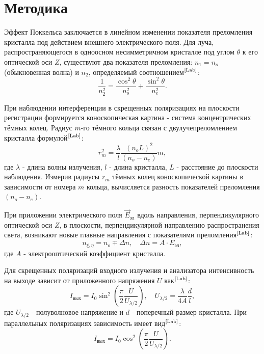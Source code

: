 \chapter{Методика} \vspace{-20pt}
\label{ch:methods}

Эффект Поккельса заключается в линейном изменении показателя преломления кристалла под действием внешнего электрического поля. 
Для луча, распространяющегося в одноосном несимметричном кристалле под углом $\theta$ к его оптической оси $Z$, существуют два показателя преломления: $n_1 = n_o$ (обыкновенная волна) и $n_2$, определяемый соотношением$^\text{\cite{Lab}}$:
\begin{equation} \label{eq:n2}
    \frac{1}{n_2^2} = \frac{\cos^2\theta}{n_o^2} + \frac{\sin^2\theta}{n_e^2}.
\end{equation}

При наблюдении интерференции в скрещенных поляризациях на плоскости регистрации формируется коноскопическая картина - система концентрических тёмных колец. Радиус $m$-го тёмного кольца связан с двулучепреломлением кристалла формулой$^\text{\cite{Lab}}$:
\begin{equation} \label{eq:ring_radius}
    r_m^2 = \frac{\lambda}{l} \frac{(n_o L)^2}{(n_o - n_e)} m,
\end{equation}
где $\lambda$ - длина волны излучения, $l$ - длина кристалла, $L$ - расстояние до плоскости наблюдения. Измерив радиусы $r_m$ тёмных колец коноскопической картины в зависимости от номера $m$ кольца, вычисляется разность показателей преломления $(n_o - n_e)$.

При приложении электрического поля $\vec{E}_{\text{эл}}$ вдоль направления, перпендикулярного оптической оси $Z$, в плоскости, перпендикулярной направлению распространения света, возникают новые главные направления с показателями преломления$^\text{\cite{Lab}}$:
\begin{equation} \label{eq:delta_n}
    n_{\xi,\eta} = n_o \mp \Delta n, \quad \Delta n = A \cdot E_{\text{эл}},
\end{equation}
где $A$ - электрооптический коэффициент кристалла.

Для скрещенных поляризаций входного излучения и анализатора интенсивность на выходе зависит от приложенного напряжения $U$ как$^\text{\cite{Lab}}$:
\begin{equation} \label{eq:intensity_crossed}
    I_{\text{вых}} = I_0 \sin^2\left(\frac{\pi}{2} \frac{U}{U_{\lambda/2}}\right),
        \quad U_{\lambda/2} = \frac{\lambda}{4A} \frac{d}{l},
\end{equation}
где $U_{\lambda/2}$ - полуволновое напряжение и $d$ - поперечный размер кристалла. При параллельных поляризациях зависимость имеет вид$^\text{\cite{Lab}}$:
\begin{equation} \label{eq:intensity_parallel}
    I_{\text{вых}} = I_0 \cos^2\left(\frac{\pi}{2} \frac{U}{U_{\lambda/2}}\right).
\end{equation}

